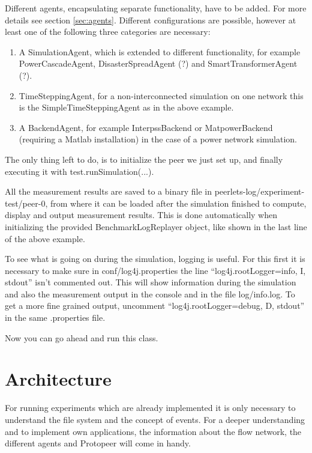 \documentclass[11pt,fleqn]{book} %
\begin{document}
Different agents, encapsulating separate functionality, have to be added. For more details see section \ref{sec:agents}. Different configurations are possible, however at least one of the following three categories are necessary:
\begin{enumerate}
	\item A SimulationAgent, which is extended to different functionality, for example PowerCascadeAgent, DisasterSpreadAgent (?) and SmartTransformerAgent (?).
	\item TimeSteppingAgent, for a non-interconnected simulation on one network this is the SimpleTimeSteppingAgent as in the above example.
	\item A BackendAgent, for example InterpssBackend or MatpowerBackend (requiring a Matlab installation) in the case of a power network simulation.
\end{enumerate}

The only thing left to do, is to initialize the peer we just set up, and finally executing it with test.runSimulation(...).

All the measurement results are saved to a binary file in peerlets-log/experiment-test/peer-0, from where it can be loaded after the simulation finished to compute, display and output measurement results. This is done automatically when initializing the provided BenchmarkLogReplayer object, like shown in the last line of the above example. 

To see what is going on during the simulation, logging is useful. For this first it is necessary to make sure in conf/log4j.properties the line “log4j.rootLogger=info, I, stdout” isn’t commented out. This will show information during the simulation and also the measurement output in the console and in the file log/info.log. To get a more fine grained output, uncomment “log4j.rootLogger=debug, D, stdout” in the same .properties file.

Now you can go ahead and run this class.



\chapter{Architecture}

For running experiments which are already implemented it is only necessary to understand the file system and the concept of events. For a deeper understanding and to implement own applications, the information about the flow network, the different agents and Protopeer will come in handy. 
\end{document}
